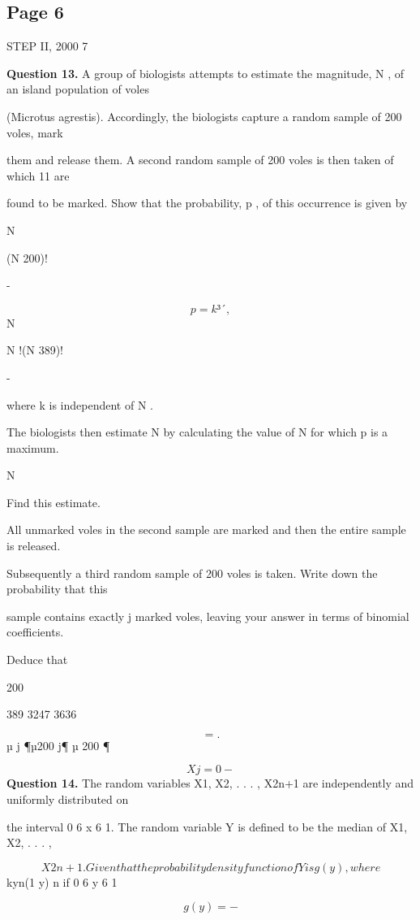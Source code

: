 \documentclass[12pt]{article}
\begin{document}
\subsection*{Page 6}
\begin{flushleft}
STEP II, 2000 7\par
\bigskip\textbf{Question 13.} A group of biologists attempts to estimate the magnitude, N , of an island population of voles\par
(Microtus agrestis). Accordingly, the biologists capture a random sample of 200 voles, mark\par
them and release them. A second random sample of 200 voles is then taken of which 11 are\par
found to be marked. Show that the probability, p , of this occurrence is given by\par
N\par
(N 200)!\par
-\par
\[p = k ³ ´ ,\]
N\par
N !(N 389)!\par
-\par
where k is independent of N .\par
The biologists then estimate N by calculating the value of N for which p is a maximum.\par
N\par
Find this estimate.\par
All unmarked voles in the second sample are marked and then the entire sample is released.\par
Subsequently a third random sample of 200 voles is taken. Write down the probability that this\par
sample contains exactly j marked voles, leaving your answer in terms of binomial coefficients.\par
Deduce that\par
200\par
389 3247 3636\par
\[= .\]
µ j ¶µ200 j¶ µ 200 ¶\par
\[Xj=0 -\]
\bigskip\textbf{Question 14.} The random variables X1, X2, . . . , X2n+1 are independently and uniformly distributed on\par
the interval 0 6 x 6 1. The random variable Y is defined to be the median of X1, X2, . . . ,\par
\[X2n+1. Given that the probability density function of Y is g (y), where\]
kyn(1 y) n if 0 6 y 6 1\par
\[g (y) = -\]

\end{flushleft}
\end{document}
